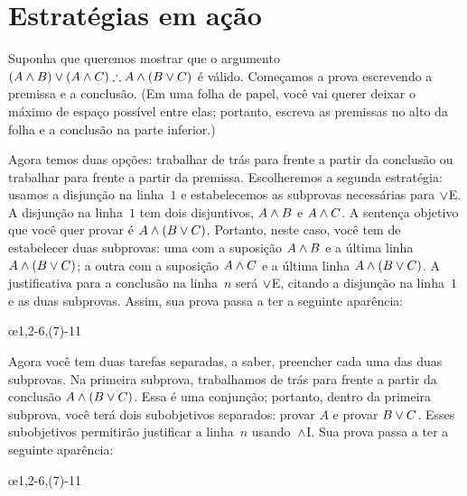 \section{Estratégias em ação}

Suponha que queremos mostrar que o argumento $(A \eand B) \eor (A \eand C) \therefore A \eand (B \eor C)$ é válido. Começamos a prova escrevendo a premissa e a conclusão. (Em uma folha de papel, você vai querer deixar o máximo de espaço possível entre elas; portanto, escreva as premissas no alto da folha e a conclusão na parte inferior.)
\begin{fitchproof}
   \PR
\ellipsesline
\end{fitchproof}
Agora temos duas opções: trabalhar de trás para frente a partir da conclusão ou trabalhar para frente a partir da premissa. Escolheremos a segunda estratégia: usamos a disjunção na linha~$1$ e estabelecemos as subprovas necessárias para $\vee$E. A disjunção na linha~$1$ tem dois disjuntivos, $A \wedge B$ e $A \wedge C$. A sentença objetivo que você quer provar é $A \wedge (B \vee C)$. Portanto, neste caso, você tem de estabelecer duas subprovas: uma com a suposição $A \wedge B$ e a última linha $A \wedge (B \vee C)$; a outra com a suposição $A \wedge C$ e a última linha $A \wedge (B \vee C)$. A justificativa para a conclusão na linha~$n$ será $\vee$E, citando a disjunção na linha~$1$ e as duas subprovas. Assim, sua prova passa a ter a seguinte aparência:
\begin{fitchproof}
	\PR
	\open
	\AS
	\ellipsesline 
	\close
	\open
	\AS
	\ellipsesline
	\close
	\oe{1,2-6,(7)-11}
\end{fitchproof}
Agora você tem duas tarefas separadas, a saber, preencher cada uma das duas subprovas. Na primeira subprova, trabalhamos de trás para frente a partir da conclusão $A \wedge (B \vee C)$. Essa é uma conjunção; portanto, dentro da primeira subprova, você terá dois subobjetivos separados: provar $A$ e provar $B \vee C$. Esses subobjetivos permitirão justificar a linha~$n$ usando~$\wedge$I. Sua prova passa a ter a seguinte aparência:
\begin{fitchproof}
	\PR
	\open
	\AS
	\ellipsesline
	\ellipsesline
	\close
	\open
	\AS
	\ellipsesline
	\close
	\oe{1,2-6,(7)-11}
\end{fitchproof}
